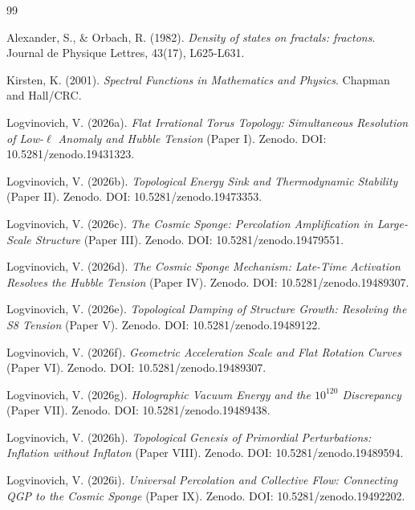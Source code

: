 \documentclass[11pt,a4paper]{article}
\begin{document}
\begin{thebibliography}{99}

Alexander, S., \& Orbach, R. (1982). \textit{Density of states on fractals: fractons}. Journal de Physique Lettres, 43(17), L625-L631.

Kirsten, K. (2001). \textit{Spectral Functions in Mathematics and Physics}. Chapman and Hall/CRC.

Logvinovich, V. (2026a). \textit{Flat Irrational Torus Topology: Simultaneous Resolution of Low-$\ell$ Anomaly and Hubble Tension} (Paper I). Zenodo. DOI: 10.5281/zenodo.19431323.

Logvinovich, V. (2026b). \textit{Topological Energy Sink and Thermodynamic Stability} (Paper II). Zenodo. DOI: 10.5281/zenodo.19473353.

Logvinovich, V. (2026c). \textit{The Cosmic Sponge: Percolation Amplification in Large-Scale Structure} (Paper III). Zenodo. DOI: 10.5281/zenodo.19479551.

Logvinovich, V. (2026d). \textit{The Cosmic Sponge Mechanism: Late-Time Activation Resolves the Hubble Tension} (Paper IV). Zenodo. DOI: 10.5281/zenodo.19489307.

Logvinovich, V. (2026e). \textit{Topological Damping of Structure Growth: Resolving the S8 Tension} (Paper V). Zenodo. DOI: 10.5281/zenodo.19489122.

Logvinovich, V. (2026f). \textit{Geometric Acceleration Scale and Flat Rotation Curves} (Paper VI). Zenodo. DOI: 10.5281/zenodo.19489307.

Logvinovich, V. (2026g). \textit{Holographic Vacuum Energy and the $10^{120}$ Discrepancy} (Paper VII). Zenodo. DOI: 10.5281/zenodo.19489438.

Logvinovich, V. (2026h). \textit{Topological Genesis of Primordial Perturbations: Inflation without Inflaton} (Paper VIII). Zenodo. DOI: 10.5281/zenodo.19489594.

Logvinovich, V. (2026i). \textit{Universal Percolation and Collective Flow: Connecting QGP to the Cosmic Sponge} (Paper IX). Zenodo. DOI: 10.5281/zenodo.19492202.


\end{thebibliography}
\end{document}
